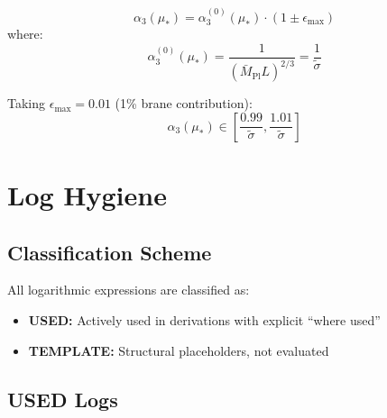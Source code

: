 \documentclass[11pt,a4paper]{article}
\theoremstyle{definition}
\begin{document}
\begin{closurebox}
\begin{equation}
\label{eq:bounded-pred}
\boxed{\alpha_3(\mu_*) = \alpha_3^{(0)}(\mu_*) \cdot (1 \pm \epsilon_{\max})}
\end{equation}
where:
\begin{equation}
\label{eq:alpha3-baseline-value}
\alpha_3^{(0)}(\mu_*) = \frac{1}{(\bar{M}_{\text{Pl}} L)^{2/3}} = \frac{1}{\tilde{\sigma}}
\end{equation}
\end{closurebox}

Taking $\epsilon_{\max} = 0.01$ (1\% brane contribution):
\begin{equation}
\label{eq:bounded-interval}
\alpha_3(\mu_*) \in \left[\frac{0.99}{\tilde{\sigma}}, \frac{1.01}{\tilde{\sigma}}\right]
\end{equation}

\section{Log Hygiene}
\label{sec:log-hygiene}

\subsection{Classification Scheme}
\label{subsec:log-classification}

All logarithmic expressions are classified as:
\begin{itemize}
  \item \textbf{USED:} Actively used in derivations with explicit ``where used''
  \item \textbf{TEMPLATE:} Structural placeholders, not evaluated
\end{itemize}

\subsection{USED Logs}
\label{subsec:used-logs}
\end{document}
